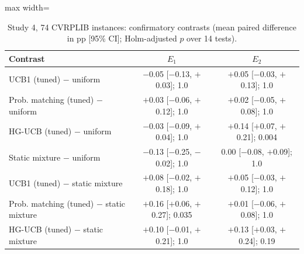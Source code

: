 \begin{table}[t]
\caption{Study 4, 74 CVRPLIB instances: confirmatory contrasts (mean paired difference in pp [95\% CI]; Holm-adjusted $p$ over 14 tests).}\label{tab:s4tests}
\centering
\small
\begin{adjustbox}{max width=\linewidth}
\begin{tabular}{lcc}
\toprule
Contrast & $E_1$ & $E_2$ \\
\midrule
UCB1 (tuned) $-$ uniform & $-$0.05 [$-$0.13, $+$0.03]; 1.0 & $+$0.05 [$-$0.03, $+$0.13]; 1.0 \\
Prob. matching (tuned) $-$ uniform & $+$0.03 [$-$0.06, $+$0.12]; 1.0 & $+$0.02 [$-$0.05, $+$0.08]; 1.0 \\
HG-UCB (tuned) $-$ uniform & $-$0.03 [$-$0.09, $+$0.04]; 1.0 & $+$0.14 [$+$0.07, $+$0.21]; 0.004 \\
Static mixture $-$ uniform & $-$0.13 [$-$0.25, $-$0.02]; 1.0 & 0.00 [$-$0.08, $+$0.09]; 1.0 \\
UCB1 (tuned) $-$ static mixture & $+$0.08 [$-$0.02, $+$0.18]; 1.0 & $+$0.05 [$-$0.03, $+$0.12]; 1.0 \\
Prob. matching (tuned) $-$ static mixture & $+$0.16 [$+$0.06, $+$0.27]; 0.035 & $+$0.01 [$-$0.06, $+$0.08]; 1.0 \\
HG-UCB (tuned) $-$ static mixture & $+$0.10 [$-$0.01, $+$0.21]; 1.0 & $+$0.13 [$+$0.03, $+$0.24]; 0.19 \\
\bottomrule
\end{tabular}
\end{adjustbox}
\end{table}
